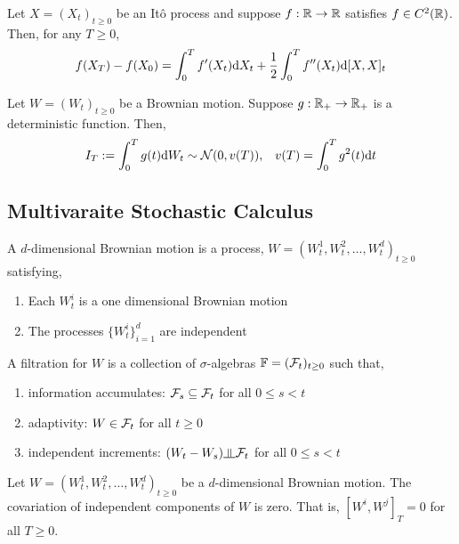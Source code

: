 \documentclass[12pt]{article}
\begin{document}
\begin{theorem}[It\^o Formula]
Let \( X = (X_t)_{t\geq 0} \) be an It\^o process and suppose \( f:\mathbb{R}\to\mathbb{R} \) satisfies \( f\in C^2(\mathbb{R}) \). Then, for any \( T\geq 0 \),
\begin{align*}
    f(X_T) - f(X_0) = \int_0^T f'(X_t)\mathrm{d} X_t + \frac{1}{2}\int_0^T f''(X_t)\mathrm{d}[X,X]_t
\end{align*}
\end{theorem}

\begin{lemma}
Let \( W = (W_t)_{t\geq 0} \) be a Brownian motion. Suppose \( g:\mathbb{R}_+\to\mathbb{R}_+ \) is a deterministic function. Then,
\begin{align*}
    I_T:=\int_0^T g(t)\mathrm{d} W_t \sim \mathcal{N}(0,v(T)), && v(T) = \int_0^T g^2(t)\mathrm{d} t
\end{align*}
\end{lemma}

\subsection{Multivaraite Stochastic Calculus}
\begin{definition}
A \( d \)-dimensional Brownian motion is a process,
\( W = (W_t^1, W_t^2, \ldots, W_t^d)_{t\geq 0} \) satisfying,
\begin{enumerate}[nolistsep]
    \item Each \( W_t^i \) is a one dimensional Brownian motion
    \item The processes \( \{W_t^i\}_{i=1}^d \) are independent
\end{enumerate}
\end{definition}

\begin{definition}
A filtration for \( W \) is a collection of \( \sigma \)-algebras \( \mathbb{F} = (\mathcal{F}_t)_{t\geq 0} \) such that,
\begin{enumerate}[nolistsep]
    \item information accumulates: \( \mathcal{F}_s \subseteq \mathcal{F}_t \) for all \( 0\leq s < t \)
    \item adaptivity: \( W\in\mathcal{F}_t \) for all \( t\geq 0 \)
    \item independent increments: \( (W_t-W_s)\indep \cF_t \)  for all \( 0\leq s < t \)
\end{enumerate}
\end{definition}

\begin{theorem}
Let \( W = (W_t^1, W_t^2, \ldots, W_t^d)_{t\geq 0} \) be a \( d \)-dimensional Brownian motion. The covariation of independent components of \( W \) is zero. That is, \( [W^i, W^j]_T = 0 \) for all \( T\geq 0 \).
\end{theorem}
\end{document}

